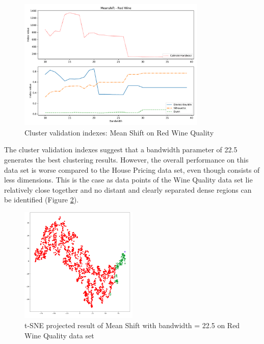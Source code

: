 \begin{figure}[H]
\begin{center}
\includegraphics[width=0.8\textwidth]{images/Meanshift_-_Red_Wine.pdf}
\end{center}
\caption{Cluster validation indexes: Mean Shift on Red Wine Quality}
\label{fig:meanshift_wine_indexes}
\end{figure}

The cluster validation indexes suggest that a bandwidth parameter of 22.5 generates the best clustering results. However, the overall performance on this data set is worse compared to the House Pricing data set, even though consists of less dimensions. This is the case as data points of the Wine Quality data set lie relatively close together and no distant and clearly separated dense regions can be identified (Figure \ref{fig:meanshift_wine_22_5}). 

\begin{figure}[H]
\begin{center}
\includegraphics[width=0.5\textwidth]{images/Meanshift_Wine_22_5.png}
\end{center}
\caption{t-SNE projected result of Mean Shift with bandwidth = 22.5 on Red Wine Quality data set}
\label{fig:meanshift_wine_22_5}
\end{figure}

